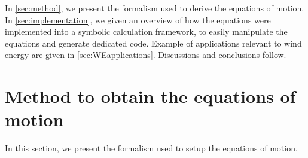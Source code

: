 \documentclass[wes, manuscript]{copernicus}
\begin{document}


In \autoref{sec:method}, we present the formalism used to derive the equations of motion. 
In \autoref{sec:implementation}, we given an overview of how the equations were implemented into a symbolic calculation framework, to easily manipulate the equations and generate dedicated code. 
Example of applications relevant to wind energy are given in \autoref{sec:WEapplications}.
Discussions and conclusions follow.










\section{Method to obtain the equations of motion}
\label{sec:method}

In this section, we present the formalism used to setup the equations of motion. 
\end{document}
